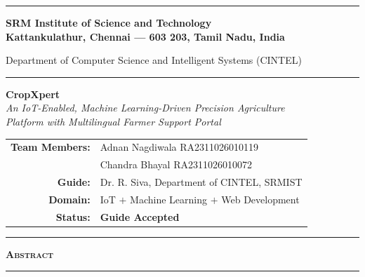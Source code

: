 \documentclass[12pt,a4paper]{article}
\begin{document}
\begin{center}

{\color{srmblue}\rule{\linewidth}{2pt}}
\vspace{0.4em}

{\Large\bfseries\color{srmblue}
SRM Institute of Science and Technology\\[2pt]
Kattankulathur, Chennai --- 603 203, Tamil Nadu, India}

\vspace{0.3em}
{\normalsize Department of Computer Science and Intelligent Systems (CINTEL)}

{\color{srmblue}\rule{\linewidth}{1pt}}

\vspace{0.6em}

{\LARGE\bfseries CropXpert}\\[4pt]
{\large\itshape An IoT-Enabled, Machine Learning-Driven Precision Agriculture\\
Platform with Multilingual Farmer Support Portal}

\vspace{0.7em}

\begin{tabular}{rl}
\textbf{Team Members:} & Adnan Nagdiwala \hspace{1em} RA2311026010119 \\
                       & Chandra Bhayal  \hspace{1.5em} RA2311026010072 \\[4pt]
\textbf{Guide:}        & Dr. R. Siva, Department of CINTEL, SRMIST \\[4pt]
\textbf{Domain:}       & IoT $+$ Machine Learning $+$ Web Development \\[4pt]
\textbf{Status:}       & \textcolor{green!50!black}{\textbf{Guide Accepted}} \\
\end{tabular}

\vspace{0.5em}
{\color{srmblue}\rule{\linewidth}{2pt}}

\end{center}

\vspace{0.8em}

\begin{center}
{\large\bfseries\scshape Abstract}
\end{center}

\noindent\rule{\linewidth}{0.4pt}
\vspace{0.3em}
\end{document}
